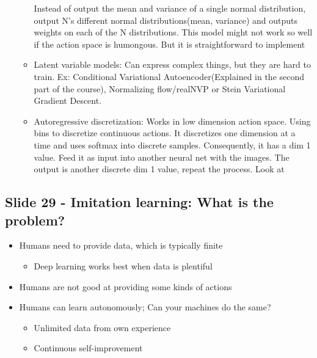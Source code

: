 \documentclass[]{article}
\begin{document}
\begin{enumerate}
\begin{itemize}
            Instead of output the mean and variance of a single normal distribution, output N's different
            normal distributions(mean, variance) and outputs weights on each of the N distributions. This model
            might not work so well if the action space is humongous. But it is straightforward to implement
        \item Latent variable models: Can express complex things, but they are hard to train. Ex: Conditional
            Variational Autoencoder(Explained in the second part of the course), Normalizing flow/realNVP or Stein Variational Gradient Descent.
        \item  Autoregressive discretization: Works in low dimension action space. Using bins to discretize continuous
            actions. It discretizes one dimension at a time and uses softmax into discrete samples. Consequently, it has
            a dim 1 value. Feed it as input into another neural net with the images. The output is another discrete dim 1 value,
            repeat the process. Look at 
    \end{itemize}
\end{enumerate}


\subsection*{Slide 29 - Imitation learning: What is the problem?}%
\label{sub:Slide 29}

\begin{itemize}
    \item Humans need to provide data, which is typically finite
        \begin{itemize}
            \item Deep learning works best when data is plentiful
        \end{itemize}
    \item Humans are not good at providing some kinds of actions
    \item Humans can learn autonomously; Can your machines do the same?
    \begin{itemize}
        \item Unlimited data from own experience
        \item Continuous self-improvement
    \end{itemize}
\end{itemize}
\end{document}
